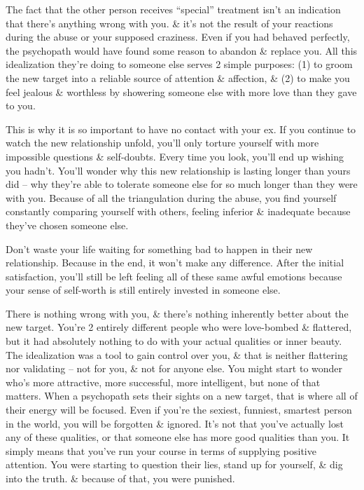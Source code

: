 \documentclass{article}
\numberwithin{equation}{section}
\begin{document}
The fact that the other person receives ``special'' treatment isn't an indication that there's anything wrong with you. \& it's not the result of your reactions during the abuse or your supposed craziness. Even if you had behaved perfectly, the psychopath would have found some reason to abandon \& replace you. All this idealization they're doing to someone else serves 2 simple purposes: (1) to groom the new target into a reliable source of attention \& affection, \& (2) to make you feel jealous \& worthless by showering someone else with more love than they gave to you.

This is why it is so important to have no contact with your ex. If you continue to watch the new relationship unfold, you'll only torture yourself with more impossible questions \& self-doubts. Every time you look, you'll end up wishing you hadn't. You'll wonder why this new relationship is lasting longer than yours did -- why they're able to tolerate someone else for so much longer than they were with you. Because of all the triangulation during the abuse, you find yourself constantly comparing yourself with others, feeling inferior \& inadequate because they've chosen someone else.

Don't waste your life waiting for something bad to happen in their new relationship. Because in the end, it won't make any difference. After the initial satisfaction, you'll still be left feeling all of these same awful emotions because your sense of self-worth is still entirely invested in someone else.

There is nothing wrong with you, \& there's nothing inherently better about the new target. You're 2 entirely different people who were love-bombed \& flattered, but it had absolutely nothing to do with your actual qualities or inner beauty. The idealization was a tool to gain control over you, \& that is neither flattering nor validating -- not for you, \& not for anyone else. You might start to wonder who's more attractive, more successful, more intelligent, but none of that matters. When a psychopath sets their sights on a new target, that is where all of their energy will be focused. Even if you're the sexiest, funniest, smartest person in the world, you will be forgotten \& ignored. It's not that you've actually lost any of these qualities, or that someone else has more good qualities than you. It simply means that you've run your course in terms of supplying positive attention. You were starting to question their lies, stand up for yourself, \& dig into the truth. \& because of that, you were punished.
\end{document}

